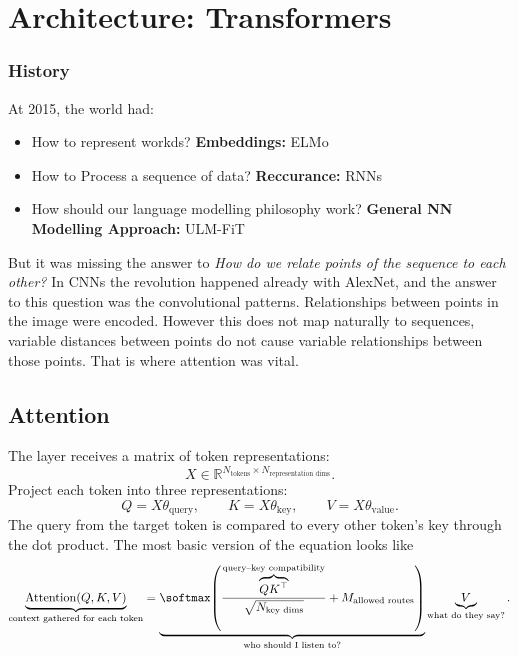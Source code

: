 \chapter{Architecture: Transformers}
\label{chap:transformers}
\subsection{History}
At 2015, the world had:
\begin{itemize}
    \item How to represent workds? \textbf{Embeddings:} ELMo
    \item How to Process a sequence of data? \textbf{Reccurance:} RNNs
    \item How should our language modelling philosophy work? \textbf{General NN Modelling Approach:} ULM-FiT
\end{itemize}
But it was missing the answer to \textit{How do we relate points of the sequence to each other?} 
In CNNs the revolution happened already with AlexNet, and the answer to this question was the convolutional patterns.
Relationships between points in the image were encoded. 
However this does not map naturally to sequences, variable distances between points do not cause variable relationships between those points.
That is where attention was vital.


\section{Attention}
\label{sec:attention}
The layer receives a matrix of token representations:
\[
X\in\mathbb{R}^{N_{\text{tokens}}\times N_{\text{representation dims}}}.
\]
Project each token into three representations:
\[
Q=X\theta_{\text{query}},\qquad
K=X\theta_{\text{key}},\qquad
V=X\theta_{\text{value}}.
\]
The query from the target token is compared to every other token's key through the dot product.
The most basic version of the equation looks like
\[
\underbrace{\operatorname{Attention}(Q,K,V)}_{\text{context gathered for each token}}
=
\underbrace{
\softmax\!\left(
\frac{\overbrace{QK^\top}^{\text{query--key compatibility}}}
{\sqrt{N_{\text{key dims}}}} + M_{\text{allowed routes}}
\right)
}_{\text{who should I listen to?}}
\underbrace{V}_{\text{what do they say?}}
.
\]

